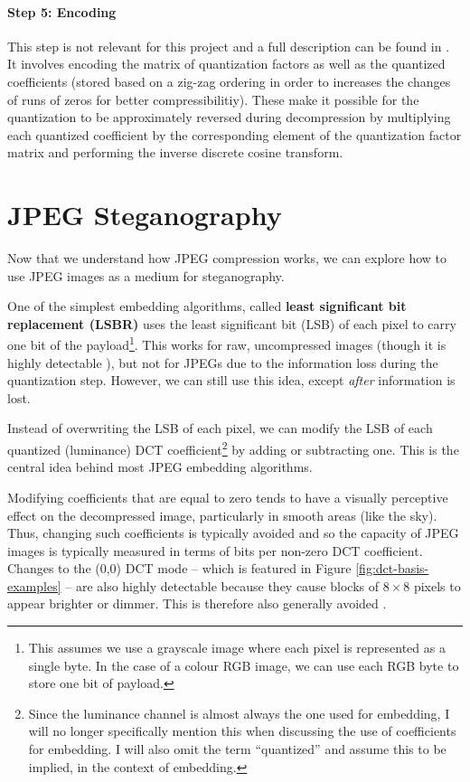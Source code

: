 \documentclass[11pt,a4paper,twoside,openright]{report}
\begin{document}
\paragraph{Step 5: Encoding} This step is not relevant for this project and a full description can be found in \cite{jpeg-standard}. It involves encoding the matrix of quantization factors as well as the quantized coefficients (stored based on a zig-zag ordering in order to increases the changes of runs of zeros for better compressibilitiy). These make it possible for the quantization to be approximately reversed during decompression by multiplying each quantized coefficient by the corresponding element of the quantization factor matrix and performing the inverse discrete cosine transform.


\section{JPEG Steganography} \label{sec:jpeg-steganography}

Now that we understand how JPEG compression works, we can explore how to use JPEG images as a medium for steganography.

One of the simplest embedding algorithms, called \textbf{least significant bit replacement (LSBR)} uses the least significant bit (LSB) of each pixel to carry one bit of the payload\footnote{This assumes we use a grayscale image where each pixel is represented as a single byte. In the case of a colour RGB image, we can use each RGB byte to store one bit of payload.}. This works for raw, uncompressed images (though it is highly detectable \cite{ker-notes}), but not for JPEGs due to the information loss during the quantization step. However, we can still use this idea, except \textit{after} information is lost.

Instead of overwriting the LSB of each pixel, we can modify the LSB of each quantized (luminance) DCT coefficient\footnote{Since the luminance channel is almost always the one used for embedding, I will no longer specifically mention this when discussing the use of coefficients for embedding. I will also omit the term ``quantized'' and assume this to be implied, in the context of embedding.} by adding or subtracting one. This is the central idea behind most JPEG embedding algorithms.

Modifying coefficients that are equal to zero tends to have a visually perceptive effect on the decompressed image, particularly in smooth areas (like the sky). Thus, changing such coefficients is typically avoided and so the capacity of JPEG images is typically measured in terms of bits per non-zero DCT coefficient. Changes to the (0,0) DCT mode -- which is featured in Figure \ref{fig:dct-basis-examples} -- are also highly detectable because they cause blocks of $8\times8$ pixels to appear brighter or dimmer. This is therefore also generally avoided \cite{ker-notes}.
\end{document}
